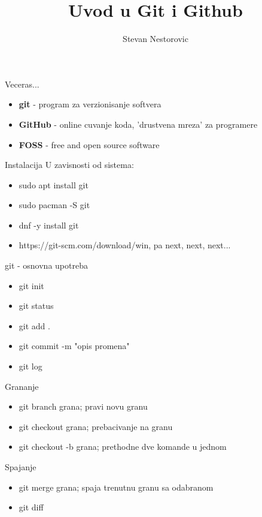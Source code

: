 \documentclass{beamer}
\title[Git \& Github]{Uvod u Git i Github}
\author{Stevan Nestorovic}
\date{}
\begin{document}
	\begin{frame}
	\titlepage
	\end{frame}
	
	\begin{frame}{Veceras... }
		\begin{itemize}
		\item \textbf{git} - program za verzionisanje softvera
		\item \textbf{GitHub} - online cuvanje koda, 'drustvena mreza' za programere
		\item \textbf{FOSS} - free and open source software
		\end{itemize}
	\end{frame}	
				
	\begin{frame}{Instalacija}
		U zavisnosti od sistema:
		\begin{itemize}
		\item sudo apt install git
		\item sudo pacman -S git
		\item dnf -y install git
		\item https://git-scm.com/download/win, pa next, next, next...
		\end{itemize}
	\end{frame}
	
	\begin{frame}{git - osnovna upotreba}
		\begin{itemize}
			\item git init 
			\item git status
			\item git add .
			\item git commit -m "opis promena"
			\item git log
		\end{itemize}
	\end{frame}
		
	\begin{frame}{Grananje}
		\begin{itemize}
			\item git branch grana; pravi novu granu
			\item git checkout grana; prebacivanje na granu
			\item git checkout -b grana; prethodne dve komande u jednom
		\end{itemize}
	\end{frame}
	
	\begin{frame}{Spajanje}
		\begin{itemize}
			\item git merge grana; spaja trenutnu granu sa odabranom
			\item git diff
		\end{itemize}
	\end{frame}
	
\end{document}
